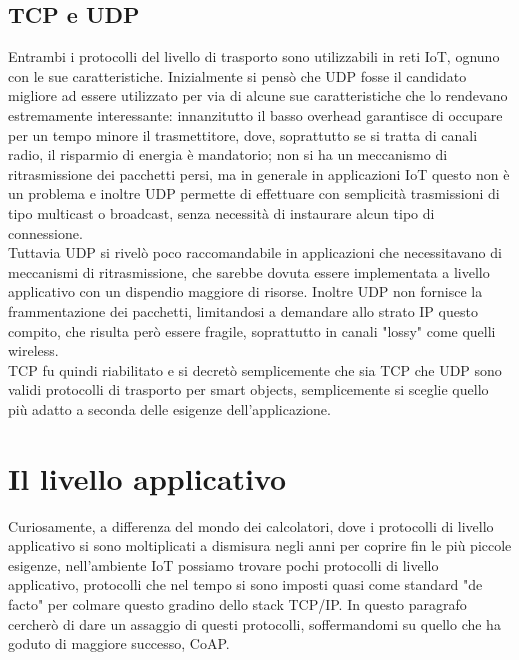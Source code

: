 \subsection{TCP e UDP}
Entrambi i protocolli del livello di trasporto sono utilizzabili in reti IoT, ognuno con le sue caratteristiche. Inizialmente si pensò che UDP fosse il candidato migliore ad essere utilizzato per via di alcune sue caratteristiche che lo rendevano estremamente interessante: innanzitutto il basso overhead garantisce di occupare per un tempo minore il trasmettitore, dove, soprattutto se si tratta di canali radio, il risparmio di energia è mandatorio; non si ha un meccanismo di ritrasmissione dei pacchetti persi, ma in generale in applicazioni IoT questo non è un problema e inoltre UDP permette di effettuare con semplicità trasmissioni di tipo multicast o broadcast, senza necessità di instaurare alcun tipo di connessione.
\\Tuttavia UDP si rivelò poco raccomandabile in applicazioni che necessitavano di meccanismi di ritrasmissione, che sarebbe dovuta essere implementata a livello applicativo con un dispendio maggiore di risorse. Inoltre UDP non fornisce la frammentazione dei pacchetti, limitandosi a demandare allo strato IP questo compito, che risulta però essere fragile, soprattutto in canali "lossy" come quelli wireless.
\\TCP fu quindi riabilitato e si decretò semplicemente che sia TCP che UDP sono validi protocolli di trasporto per smart objects, semplicemente si sceglie quello più adatto a seconda delle esigenze dell'applicazione.

\section{Il livello applicativo}
Curiosamente, a differenza del mondo dei calcolatori, dove i protocolli di livello applicativo si sono moltiplicati a dismisura negli anni per coprire fin le più piccole esigenze, nell'ambiente IoT possiamo trovare pochi protocolli di livello applicativo, protocolli che nel tempo si sono imposti quasi come standard "de facto" per colmare questo gradino dello stack TCP/IP. In questo paragrafo cercherò di dare un assaggio di questi protocolli, soffermandomi su quello che ha goduto di maggiore successo, CoAP.


